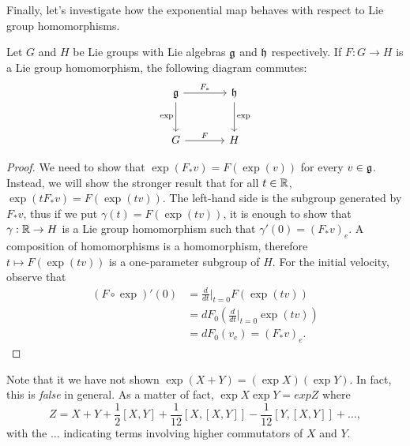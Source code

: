 Finally, let's investigate how the exponential map behaves with respect to Lie group homomorphisms.

\begin{proposition}
  Let $G$ and $H$ be Lie groups with Lie algebras $\mathfrak{g}$ and $\mathfrak{h}$ respectively.
  If $F:G\to H$ is a Lie group homomorphism, the following diagram commutes:
  \begin{equation}\nonumber
    \begin{tikzcd}[row sep=large, column sep=large]
      \fg \arrow[r, "F_*"] \arrow[d, "\exp" left] & \fh \arrow[d, "\exp"] \\
      G \arrow[r, "F"] & H
    \end{tikzcd}
  \end{equation}
\end{proposition}
\begin{proof}
  We need to show that $\exp(F_*v) = F(\exp(v))$ for every $v\in \mathfrak{g}$.
  Instead, we will show the stronger result that for all $t\in\mathbb{R}$, $\exp(t F_*v) = F(\exp(tv))$.
  The left-hand side is the subgroup generated by $F_* v$, thus if we put $\gamma(t) = F(\exp(tv))$, it is enough to show that $\gamma:\mathbb{R}\to H$ is a Lie group homomorphism such that $\gamma'(0) = (F_*v)_e$.
  A composition of homomorphisms is a homomorphism, therefore $t\mapsto F(\exp(tv))$ is a one-parameter subgroup of $H$.
  For the initial velocity, observe that
  \begin{align}
    (F\circ\exp)'(0) &= \frac{d}{dt}\Big|_{t=0} F(\exp(tv)) \\
    &=dF_0\left(\frac{d}{dt}\Big|_{t=0} \exp(tv) \right) \\
    &= dF_0(v_e) = (F_*v)_e.
  \end{align}
\end{proof}

\begin{remark}
  Note that it we have not shown $\exp(X + Y) = (\exp X)(\exp Y)$.
  In fact, this is \emph{false} in general.
  As a matter of fact, $\exp X \exp Y = exp Z$ where
  \begin{equation}
    Z = X + Y + \frac{1}2 [X,Y] + \frac1{12}[X,[X,Y]] - \frac1{12}[Y,[X,Y]] + \ldots,
  \end{equation}
  with the $\ldots$ indicating terms involving higher commutators of $X$ and $Y$.
\end{remark}

